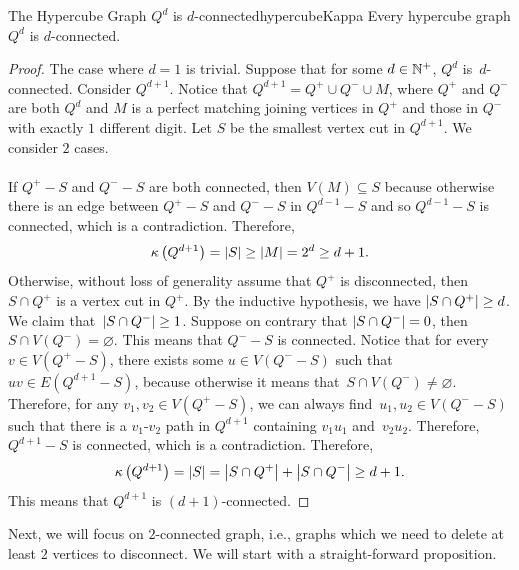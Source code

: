 \documentclass[math]{amznotes}
\theoremstyle{remark}
\begin{document}
\begin{probox}{The Hypercube Graph $Q^d$ is $d$-connected}{hypercubeKappa}
    Every hypercube graph $Q^d$ is $d$-connected.
    \tcblower
    \begin{proof}
        The case where $d = 1$ is trivial. Suppose that for some $d \in \mathbb{N}^+$, $Q^d$ is~$d$-connected. Consider $Q^{d + 1}$. Notice that $Q^{d + 1} = Q^+ \cup Q^- \cup M$, where $Q^+$ and $Q^-$ are both $Q^d$ and $M$ is a perfect matching joining vertices in $Q^+$ and those in $Q^-$ with exactly $1$ different digit. Let $S$ be the smallest vertex cut in $Q^{d + 1}$. We consider $2$ cases.
        \\\\
        If $Q^+ - S$ and $Q^- - S$ are both connected, then $V(M) \subseteq S$ because otherwise there is an edge between $Q^+ - S$ and $Q^- - S$ in $Q^{d - 1} - S$ and so $Q^{d - 1} - S$ is connected, which is a contradiction. Therefore,
        \begin{equation*}
            \kappa\left(Q^{d + 1}\right) = {\left\lvert {S} \right\rvert} \geq {\left\lvert {M} \right\rvert} = 2^{d} \geq d + 1.
        \end{equation*}
        Otherwise, without loss of generality assume that $Q^+$ is disconnected, then $S \cap Q^+$ is a vertex cut in $Q^+$. By the inductive hypothesis, we have ${\left\lvert {S \cap Q^+} \right\rvert} \geq d$. We claim that~${\left\lvert {S \cap Q^-} \right\rvert} \geq 1$. Suppose on contrary that ${\left\lvert {S \cap Q^-} \right\rvert} = 0$, then $S \cap V\left(Q^-\right) = \varnothing$. This means that $Q^- - S$ is connected. Notice that for every $v \in V\left(Q^+ - S\right)$, there exists some $u \in V\left(Q^- - S\right)$ such that $uv \in E\left(Q^{d + 1} - S\right)$, because otherwise it means that~$S \cap V\left(Q^-\right) \neq \varnothing$. Therefore, for any $v_1, v_2 \in V\left(Q^+ - S\right)$, we can always find~$u_1, u_2 \in V\left(Q^- - S\right)$ such that there is a $v_1$-$v_2$ path in $Q^{d + 1}$ containing $v_1u_1$ and~$v_2u_2$. Therefore, $Q^{d + 1} - S$ is connected, which is a contradiction. Therefore, 
        \begin{equation*}
            \kappa\left(Q^{d + 1}\right) = {\left\lvert {S} \right\rvert} = {\left\lvert {S \cap Q^+} \right\rvert} + {\left\lvert {S \cap Q^-} \right\rvert} \geq d + 1.
        \end{equation*}
        This means that $Q^{d + 1}$ is $(d + 1)$-connected.
    \end{proof}
\end{probox}
Next, we will focus on $2$-connected graph, i.e., graphs which we need to delete at least $2$ vertices to disconnect. We will start with a straight-forward proposition.
\end{document}
